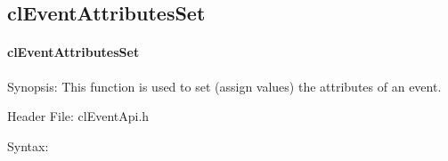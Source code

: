 \begin{flushleft}
\subsection{clEventAttributesSet}
\hypertarget{pageem109}{}\paragraph{cl\-Event\-Attributes\-Set}\label{pageem109}
\begin{Desc}
\item[Synopsis:]This function is used to set (assign values) the attributes of an event.  \end{Desc}
\begin{Desc}
\item[Header File:]clEventApi.h\end{Desc}
\begin{Desc}
\item[Syntax:]


\end{Desc}
\end{flushleft}
